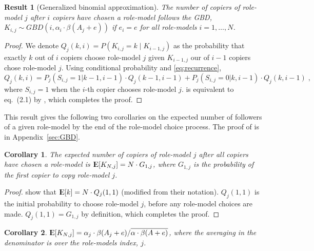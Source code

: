\documentclass[12pt]{extarticle}
\DeclareMathOperator*{\E}{{\rm I\kern-.3em E}}
\newtheorem{corollary}{Corollary}
\newtheorem{result}{Result}
\begin{document}
\begin{result}[Generalized binomial approximation]\label{res:GBD}
The number of copiers of role-model $j$ after $i$ copiers have chosen a role-model follows the GBD, $K_{i,j} \sim GBD(i,\alpha_i\cdot\beta(A_j+e))$ if $e_i=e$ for all role-models $i=1, \ldots, N$. 
\end{result}

\begin{proof}
We denote $Q_j(k,i)=P(K_{i,j} = k \mid K_{i-1,j})$ as the probability that exactly $k$ out of $i$ copiers choose role-model $j$ given $K_{i-1,j}$ our of $i-1$ copiers chose role-model $j$. 
Using conditional probability and \cref{eq:recurrence},
\begin{equation}\label{recursive}
Q_j(k,i) = P_j(S_{i,j}=1 | k-1,i-1) \cdot Q_j(k-1,i-1) + P_j(S_{i,j} =0 | k,i-1) \cdot Q_j(k,i-1) \;,
\end{equation}
where $S_{i,j} =1 $ when the $i$-th copier chooses role-model $j$.
 is equivalent to eq.~(2.1) by \citet{GBD}, which completes the proof.
\end{proof}
This result gives the following two corollaries on the expected number of followers of a given role-model by the end of the role-model choice process. The proof of  is in Appendix~\ref{sec:GBD}.
\\


\begin{corollary} The expected number of copiers of role-model $j$ after all copiers have chosen a role-model is
$\E[K_{N,j}] = N \cdot G_{1,j}$, where $G_{1,j}$ is the probability of the first copier to copy role-model $j$.
\end{corollary}

\begin{proof}
\citet[eq.~(2.3)]{GBD} show that 
$\E[k] = N \cdot Q_j(1,1)$ (modified from their notation).
$Q_j(1,1)$ is the initial probability to choose role-model $j$, before any role-model choices are made.
$Q_j(1,1) = G_{1,j}$ by definition, which completes the proof.
\end{proof}

\begin{corollary}\label{cor:GBD}
$\E[K_{N, j}] = \alpha_j \cdot \beta(A_j+e) / \overline{\alpha \cdot \beta(A+e)}$, where the averaging in the denominator is over the role-models index, $j$.
\end{corollary}
\end{document}
